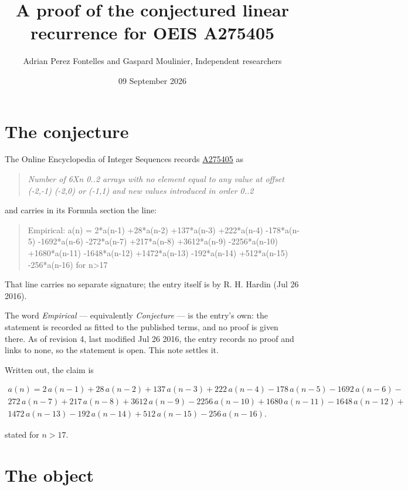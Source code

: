 \documentclass[11pt]{article}
\title{A proof of the conjectured linear recurrence for OEIS A275405}
\author{Adrian Perez Fontelles and Gaspard Moulinier, Independent researchers}
\date{09 September 2026}
\theoremstyle{definition}
\begin{document}
\maketitle
\section{The conjecture}

The Online Encyclopedia of Integer Sequences records \href{https://oeis.org/A275405}{A275405} as

\begin{quote}\itshape Number of 6Xn 0..2 arrays with no element equal to any value at offset (-2,-1) (-2,0) or (-1,1) and new values introduced in order 0..2\end{quote}

and carries in its Formula section the line:

\begin{quote}\ttfamily Empirical: a(n) = 2*a(n-1) +28*a(n-2) +137*a(n-3) +222*a(n-4) -178*a(n-5) -1692*a(n-6) -272*a(n-7) +217*a(n-8) +3612*a(n-9) -2256*a(n-10) +1680*a(n-11) -1648*a(n-12) +1472*a(n-13) -192*a(n-14) +512*a(n-15) -256*a(n-16) for n>17\end{quote}

That line carries no separate signature; the entry itself is by R. H. Hardin (Jul 26 2016).

The word {\itshape Empirical} --- equivalently {\itshape Conjecture} --- is the entry's own: the statement is recorded as fitted to the published terms, and no proof is given there. As of revision 4, last modified Jul 26 2016, the entry records no proof and links to none, so the statement is open. This note settles it.

Written out, the claim is

\begin{multline*} a(n) = 2\,a(n-1) + 28\,a(n-2) + 137\,a(n-3) + 222\,a(n-4) - 178\,a(n-5) - 1692\,a(n-6) - \\ 272\,a(n-7) + 217\,a(n-8) + 3612\,a(n-9) - 2256\,a(n-10) + 1680\,a(n-11) - 1648\,a(n-12) + \\ 1472\,a(n-13) - 192\,a(n-14) + 512\,a(n-15) - 256\,a(n-16). \end{multline*}

stated for $n > 17$.

\section{The object}
\end{document}
